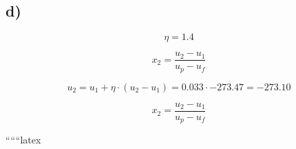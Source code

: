 

\subsection*{d)}

\begin{equation*}
\eta = 1.4
\end{equation*}

\begin{equation*}
x_2 = \frac{u_2 - u_1}{u_p - u_f}
\end{equation*}

\begin{equation*}
u_2 = u_1 + \eta \cdot (u_2 - u_1) = 0.033 \cdot -273.47 = -273.10
\end{equation*}

\begin{equation*}
x_2 = \frac{u_2 - u_1}{u_p - u_f}
\end{equation*}

``````latex